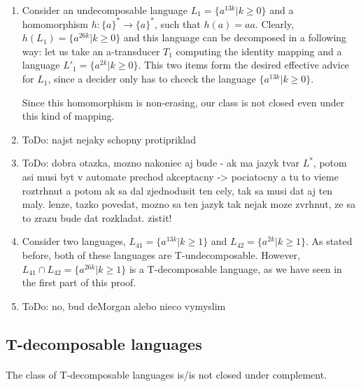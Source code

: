 \paragraph{}
\dokaz
\begin{enumerate}
\item Consider an undecomposable language $L_1 = \{ a^{13k} | k \geq 0 \}$ and a homomorphism $h: \{ a\}^* \to \{ a \}^*$, such that $h(a) = aa$. Clearly, $h(L_1) = \{ a^{26k} | k \geq 0 \}$ and this language can be decomposed in a following way: let us take an a-transducer $T_1$ computing the identity mapping and a language $L'_1 = \{ a^{2k} | k \geq 0 \}$. This two items form the desired effective advice for $L_1$, since a decider only has to chceck the language $\{ a^{13k} | k \geq 0 \}$.

Since this homomorphism is non-erasing, our class is not closed even under this kind of mapping.

\item \color{red}ToDo: najst nejaky schopny protipriklad\color{black}

\item \color{red}ToDo: dobra otazka, mozno nakoniec aj bude - ak ma jazyk  tvar $L^*$, potom asi musi byt v automate prechod akceptacny -> pociatocny a tu to vieme roztrhnut a potom ak sa dal zjednodusit ten cely, tak sa musi dat aj ten maly. lenze, tazko povedat, mozno sa ten jazyk tak nejak moze zvrhnut, ze sa to zrazu bude dat rozkladat. zistit!\color{black}

\item Consider two languages, $L_{41} = \{ a^{13k} | k \geq 1 \}$ and $L_{42} = \{ a^{2k} | k \geq 1 \}$. As stated before, both of these languages are T-undecomposable. However, $L_{41} \cap L_{42} = \{ a^{26k} | k \geq 1 \}$ is a T-decomposable language, as we have seen in the first part of this proof.

\item \color{red}ToDo: no, bud deMorgan alebo nieco vymyslim\color{black}
\end{enumerate}

\subsection{T-decomposable languages}
\paragraph{}
\cveta The class of T-decomposable languages is/is not closed under complement.

